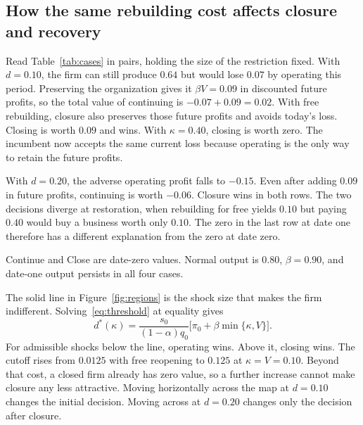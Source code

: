 \documentclass[11pt,letterpaper]{article}
\begin{document}
\subsection*{How the same rebuilding cost affects closure and recovery}
Read Table~\ref{tab:cases} in pairs, holding the size of the restriction fixed. With $d=0.10$, the firm can still produce $0.64$ but would lose $0.07$ by operating this period. Preserving the organization gives it $\beta V=0.09$ in discounted future profits, so the total value of continuing is $-0.07+0.09=0.02$. With free rebuilding, closure also preserves those future profits and avoids today's loss. Closing is worth $0.09$ and wins. With $\kappa=0.40$, closing is worth zero. The incumbent now accepts the same current loss because operating is the only way to retain the future profits.

With $d=0.20$, the adverse operating profit falls to $-0.15$. Even after adding $0.09$ in future profits, continuing is worth $-0.06$. Closure wins in both rows. The two decisions diverge at restoration, when rebuilding for free yields $0.10$ but paying $0.40$ would buy a business worth only $0.10$. The zero in the last row at date one therefore has a different explanation from the zero at date zero.

\begin{table}[!htbp]
\centering\small
\caption{The incumbent's decision under matched adverse shocks}\label{tab:cases}

\par\smallskip\begin{minipage}{.94\linewidth}\footnotesize
Continue and Close are date-zero values. Normal output is $0.80$, $\beta=0.90$, and date-one output persists in all four cases.
\end{minipage}
\end{table}

The solid line in Figure~\ref{fig:regions} is the shock size that makes the firm indifferent. Solving~\eqref{eq:threshold} at equality gives
\[
 d^*(\kappa)=\frac{s_0}{(1-\alpha)q_0}
              \bigl[\pi_0+\beta\min\{\kappa,V\}\bigr].
\]
For admissible shocks below the line, operating wins. Above it, closing wins. The cutoff rises from $0.0125$ with free reopening to $0.125$ at $\kappa=V=0.10$. Beyond that cost, a closed firm already has zero value, so a further increase cannot make closure any less attractive. Moving horizontally across the map at $d=0.10$ changes the initial decision. Moving across at $d=0.20$ changes only the decision after closure.
\end{document}

